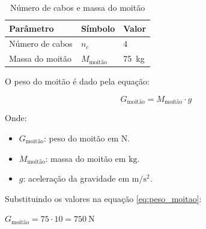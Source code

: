 \begin{table}[H]
  \centering
  \caption{Número de cabos e massa do moitão}
  \begin{tabularx}{\textwidth}{>{\centering\arraybackslash}X>{\centering\arraybackslash}X>{\centering\arraybackslash}X}
    \toprule
    Parâmetro       & Símbolo             & Valor               \\
    \midrule
    Número de cabos & $n_c$               & $4$                 \\
    Massa do moitão & $M_{\text{moitão}}$ & \SI{75}{\kilo\gram} \\
    \bottomrule
  \end{tabularx}
\end{table}

O peso do moitão é dado pela equação:

\begin{equation}
  G_{\text{moitão}} = M_{\text{moitão}} \cdot g
  \label{eq:peso_moitao}
\end{equation}

Onde:
\begin{itemize}[leftmargin=1.25cm]
  \item $G_{\text{moitão}}$: peso do moitão em $\si{\newton}$.
  \item $M_{\text{moitão}}$: massa do moitão em $\si{\kilo\gram}$.
  \item $g$: aceleração da gravidade em $\si{\meter/\second^2}$.
\end{itemize}

\vspace{1em}

Substituindo os valores na equação \eqref{eq:peso_moitao}:

$G_{\text{moitão}} = 75 \cdot 10 = \SI{750}{\newton}$
